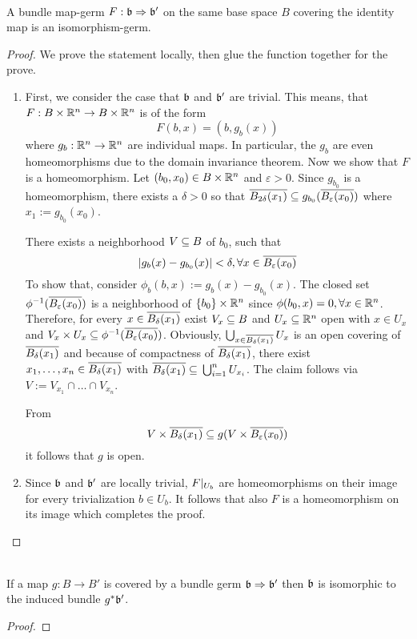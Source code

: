  \\
A bundle map-germ $F: \mathfrak{b} \Rightarrow \mathfrak{b}'$ on the same base space $B$ covering the identity map is an isomorphism-germ.
\begin{proof}
We prove the statement locally, then glue the function together for the prove.
\begin{enumerate}
    \item
    First, we consider the case that $\mathfrak{b}$ and $\mathfrak{b}'$ are trivial.
    This means, that $F: B \times \mathbb{R}^n \to B \times \mathbb{R}^n$ is of the form
    \[ F(b, x) = (b, g_b(x)) \]
    where $g_b: \mathbb{R}^n \to \mathbb{R}^n$ are individual maps.
    In particular, the $g_b$ are even homeomorphisms due to the domain invariance theorem.
    Now we show that $F$ is a homeomorphism.
    Let $(b_0, x_0) \in B \times \mathbb{R}^n$ and $\varepsilon > 0$.
    Since $g_{b_0}$ is a homeomorphism, there exists a $\delta > 0$ so that
    $\clball[2\delta][x_1] \sub g_{b_0}(\clball[\varepsilon][x_0])$ where $x_1 := g_{b_0}(x_0)$.

    There exists a neighborhood $V \subseteq{} B$ of $b_0$, such that
    \[ \abs{g_b(x) - g_{b_0}(x)} < \delta, \forall x \in \clball[\varepsilon][x_0] \]
    To show that, consider $\phi_b(b, x) := g_b(x) - g_{b_0}(x)$.
    The closed set $\phi^{-1}(\clball[\varepsilon][x_0])$ is a neighborhood of $\{b_0\} \times \mathbb{R}^n$ since
    $\phi(b_0, x) = 0, \forall x \in \mathbb{R}^n$.
    Therefore, for every $x \in \clball[\delta][x_1]$ exist $V_x \subseteq{} B$ and $U_x \subseteq{} \mathbb{R}^n$ open with $x \in U_x$ and $V_x \times U_x \sub \phi^{-1}(\clball[\varepsilon][x_0])$.
    Obviously, $\bigcup_{x \in \clball[\delta][x_1]} U_x$ is an open covering of $\clball[\delta][x_1]$ and because of compactness of $\clball[\delta][x_1]$, there
    exist $x_1, \dots, x_n \in \clball[\delta][x_1]$ with $\clball[\delta][x_1] \sub \bigcup_{i = 1}^{n} U_{x_i}$.
    The claim follows via $V := V_{x_1} \cap \dots \cap V_{x_n}$.

    From
    \[ V \times \clball[\delta][x_1] \sub g(V \times \clball[\varepsilon][x_0]) \]
    it follows that $g$ is open.
    \item
    Since $\mathfrak{b}$ and $\mathfrak{b}'$ are locally trivial, $F\vert_{U_b}$ are homeomorphisms on their image for every trivialization $b \in U_b$.
    It follows that also $F$ is a homeomorphism on its image which completes the proof.
\end{enumerate}
\end{proof}

 \\
If a map $g: B \to B'$ is covered by a bundle germ $\mathfrak{b} \Rightarrow \mathfrak{b}'$ then $\mathfrak{b}$ is isomorphic to the induced bundle $g^*\mathfrak{b}'$.
\begin{proof}
\end{proof}